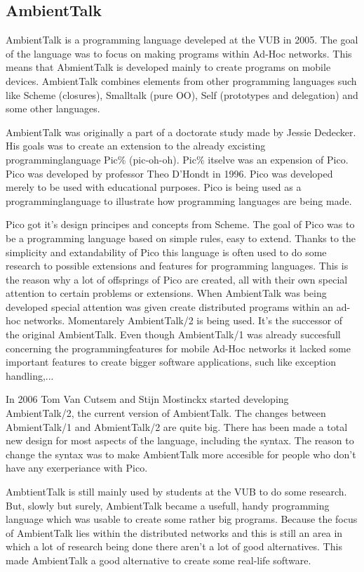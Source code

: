 \documentclass[a4paper,12pt]{report}
\begin{document}
\subsection{AmbientTalk}
AmbientTalk is a programming language develeped at the VUB in 2005. The goal of the language was to focus on making programs within Ad-Hoc networks. This means that AbmientTalk is developed mainly
to create programs on mobile devices. AmbientTalk combines elements from other programming languages such like Scheme (closures), Smalltalk (pure OO), Self (prototypes and delegation) and some
other languages.

AmbientTalk was originally a part of a doctorate study made by Jessie Dedecker. His goals was to create an extension to the already excisting programminglanguage Pic\% (pic-oh-oh). Pic\% itselve
was an expension of Pico. Pico was developed by professor Theo D'Hondt in 1996. Pico was developed merely to be used with educational purposes. Pico is being used as a programminglanguage to
illustrate how programming languages are being made.

Pico got it's design principes and concepts from Scheme. The goal of Pico was to be a programming language based on simple rules, easy to extend. Thanks to the simplicity and extandability of Pico
this language is often used to do some research to possible extensions and features for programming languages. This is the reason why a lot of offsprings of Pico are created, all with their own
special attention to certain problems or extensions. When AmbientTalk was being developed special attention was given create distributed programs within an ad-hoc networks.
Momentarely AmbientTalk/2 is being used. It's the successor of the original AmbientTalk. Even though AmbientTalk/1 was already succesfull concerning the programmingfeatures for mobile Ad-Hoc
networks it lacked some important features to create bigger software applications, such like exception handling,...

In 2006 Tom Van Cutsem and Stijn Mostinckx started developing AmbientTalk/2, the current version of AmbientTalk. The changes between AbmientTalk/1 and AbmientTalk/2 are quite big. There has been
made a total new design for most aspects of the language, including the syntax. The reason to change the syntax was to make AmbientTalk more accesible for people who don't have any exerperiance
with Pico. 

AmbtientTalk is still mainly used by students at the VUB to do some research. But, slowly but surely, AmbientTalk became a usefull, handy programming language which was usable to create some
rather big programs. Because the focus of AmbientTalk lies within the distributed networks and this is still an area in which a lot of research being done there aren't a lot of good alternatives.
This made AmbientTalk a good alternative to create some real-life software.
\end{document}
